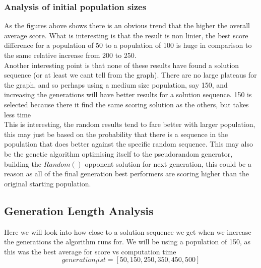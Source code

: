 \subsubsection{Analysis of initial population sizes}
As the figures above shows there is an obvious trend that the higher the overall average score. What is interesting is that the result is non linier, the best score difference for a population of 50 to a population of 100 is huge in comparison to the same relative increase from 200 to 250.\\
Another interesting point is that none of these results have found a solution sequence (or at least we cant tell from the graph). There are no large plateaus for the graph, and so perhaps using a medium size population, say 150, and increasing the generations will have better results for a solution sequence. 150 is selected because there it find the same scoring solution as the others, but takes less time\\
This is interesting, the random results tend to fare better with larger population, this may just be based on the probability that there is a sequence in the population that does better against the specific random sequence. This may also be the genetic algorithm optimising itself to the pseudorandom generator, building the \(Random()\) opponent solution for next generation, this could be a reason as all of the final generation best performers are scoring higher than the original starting population. 

\subsection{Generation Length Analysis}
Here we will look into how close to a solution sequence we get when we increase the generations the algorithm runs for. We will be using a population of 150, as this was the best average for score vs computation time\\
    
    \[generation_list = [50,150,250,350,450,500]\]

